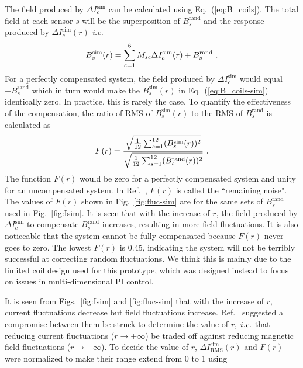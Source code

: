 The field produced by $ \Delta I_c^{\text{sim}}$ can be calculated using Eq.~(\ref{eq:B_coils}). The total field at each sensor $s$ will be the superposition of $B_s^{\text{rand}}$ and the response produced by $ \Delta I_c^{\text{sim}}(r)$ {\it i.e.}
\begin{equation}\label{eq:B_coils-sim}
    B_s^{\text{sim}}(r) =\sum_{c=1}^6 M_{sc} \Delta I_c^{\text{sim}}(r) + B_s^{\text{rand}}~{\rm .}
\end{equation}
For a perfectly compensated system, the field produced by $ \Delta I_c^{\text{sim}}$ would equal $- B_s^{\text{rand}}$ which in turn would make the $B_s^{\text{sim}}(r)$ in Eq.~(\ref{eq:B_coils-sim}) identically zero. In practice, this is rarely the case. To quantify the effectiveness of the compensation,  the ratio of RMS of $B_s^{\text{sim}}(r)$ to the RMS of $B_s^{\text{rand}}$ is calculated as
\begin{equation}\label{eq:fluc}
    F(r)=\frac{\sqrt{\frac{1}{12} \sum_{s=1}^{12} (B_s^{\text{sim}}(r))^2}}{\sqrt{\frac{1}{12} \sum_{s=1}^{12} (B_s^{\text{rand}}(r))^2}}~{\rm .}
\end{equation}
The function $F(r)$ would be zero for a perfectly compensated system and unity for an uncompensated system. In Ref.~\cite{bea}, $F(r)$ is called the ``remaining noise". The values of $F(r)$ shown in Fig.~\ref{fig:fluc-sim} are for the same sets of $B_s^{\text{rand}}$ used in Fig.~\ref{fig:Isim}. It is seen that with the increase of $r$, the field produced by $\Delta I_c^{\text{sim}}$ to compensate $B_s^{\text{rand}}$ increases, resulting in more field fluctuations. It is also noticeable that the system cannot be fully compensated because $F(r)$ never goes to zero. The lowest $F(r)$ is 0.45, indicating the system will not be terribly successful at correcting random fluctuations. We think this is mainly due to the limited coil design used for this prototype, which was designed instead to focus on issues in multi-dimensional PI control.


It is seen from Figs.~\ref{fig:Isim} and \ref{fig:fluc-sim} that with the increase of $r$, current fluctuations decrease but field fluctuations increase. Ref.~\cite{bea} suggested a compromise between them be struck to determine the value of $r$, $\it i.e.$ that reducing current fluctuations ($r \rightarrow + \infty$) be traded off against reducing magnetic field fluctuations ($r \rightarrow - \infty$). To decide the value of $r$, $\Delta I_{\text{RMS}}^{\text{sim}}(r)$ and $F(r)$ were normalized to make their range extend from 0 to 1 using

